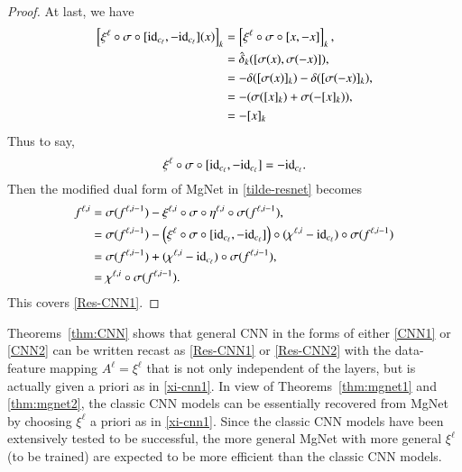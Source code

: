 \begin{proof}
	At last, we have
	\begin{align}
	\left[\xi^{\ell} \circ \sigma \circ [{\rm id}_{c_\ell}, -{\rm id}_{c_\ell}] (x) \right]_k &=  \left[\xi^{\ell} \circ \sigma \circ [x, -x]  \right]_k, \\
	&= \hat \delta_k ( [\sigma(x), \sigma(-x)]),  \\
	&= -\delta([\sigma(x)]_k) - \delta([\sigma(-x)]_k),\\
	&=-( \sigma([x]_k)+ \sigma(-[x]_k)) , \\
	&=  -[x]_k
	\end{align}
	Thus to say,
	\begin{equation}
	\xi^{\ell} \circ \sigma \circ [{\rm id}_{c_\ell}, -{\rm id}_{c_\ell}]  = -{\rm id}_{c_\ell}.
	\end{equation}
	Then the modified dual form of MgNet in \eqref{tilde-resnet} becomes
	\begin{align}
	f^{\ell,i} &= \sigma(f^{\ell,i-1}) - \xi^{\ell,i} \circ \sigma \circ \eta^{\ell,i} \circ\sigma ( f^{\ell,i-1}) , \\
	&=  \sigma(f^{\ell,i-1}) - \left( \xi^{\ell} \circ \sigma \circ [{\rm id}_{c_\ell}, -{\rm id}_{c_\ell}] \right) 
	\circ (\chi^{\ell,i} - {\rm id}_{c_\ell})\circ \sigma(f^{\ell,i-1})\\
	&=\sigma(f^{\ell,i-1}) + (\chi^{\ell,i} -{\rm id}_{c_\ell})\circ \sigma(f^{\ell,i-1}),  \\
	&=\chi^{\ell,i} \circ  \sigma (f^{\ell,i-1}).
	\end{align}
	This covers \eqref{Res-CNN1}.
\end{proof}


\begin{remark}
Theorems~\ref{thm:CNN} shows that general CNN in
the forms of either \eqref{CNN1} or \eqref{CNN2} can be written recast
as \eqref{Res-CNN1} or \eqref{Res-CNN2} with the data-feature mapping 
$A^\ell=\xi^\ell$ that is not only independent of the layers, but is
actually given a priori as in \eqref{xi-cnn1}.  In
view of Theorems~\ref{thm:mgnet1} and \ref{thm:mgnet2}, the classic
CNN models can be essentially recovered from MgNet by choosing
$\xi^\ell$ a priori as in  \eqref{xi-cnn1}.  Since
the classic CNN models have been extensively tested to be successful,
the more general MgNet with more general $\xi^\ell$ (to be trained)
are expected to be more efficient than the classic CNN models. 
\end{remark}

%